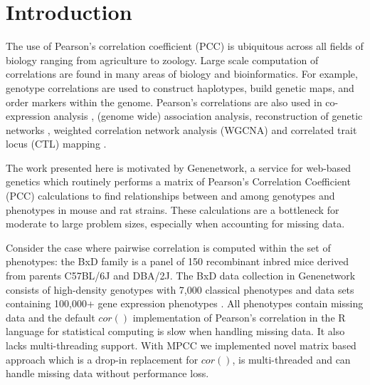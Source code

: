 \documentclass{bioinfo}
\begin{document}
\maketitle


\section{Introduction}

The use of Pearson's correlation coefficient (PCC) is ubiquitous
across all fields of biology ranging from agriculture to
zoology. Large scale computation of correlations are found in many
areas of biology and bioinformatics.  For example, genotype
correlations are used to construct haplotypes, build genetic maps, and
order markers within the genome. Pearson's correlations are also used
in co-expression analysis \citep{Tesson:2010}, (genome wide)
association analysis, reconstruction of genetic
networks \citep{Fukushima:2013}, weighted correlation network analysis
(WGCNA) \citep{Horvath:2008} and correlated trait locus (CTL)
mapping \citep{Arends2016a}.



\enlargethispage{12pt}

The work presented here is motivated by Genenetwork, a service for
web-based genetics \citep{Sloan2016} which routinely performs a matrix
of Pearson's Correlation Coefficient (PCC) calculations to find
relationships between and among genotypes and phenotypes in mouse and
rat strains. These calculations are a bottleneck for moderate to large
problem sizes, especially when accounting for missing data.

Consider the case where pairwise correlation is computed within the
set of phenotypes: the BxD family is a panel of 150 recombinant inbred
mice derived from parents C57BL/6J and DBA/2J. The BxD data collection
in Genenetwork consists of high-density genotypes with 7,000 classical
phenotypes and data sets containing 100,000+ gene expression
phenotypes \citep{Ashbrook:2019}.  All phenotypes contain missing data 
and the default $cor()$ implementation of Pearson's correlation in
the R language for statistical computing \citep{R:2005} is slow when 
handling missing data. It also lacks  multi-threading support. With 
MPCC we implemented novel matrix based approach which is a drop-in 
replacement for $cor()$, is multi-threaded and can handle missing data 
without performance loss.
\end{document}
